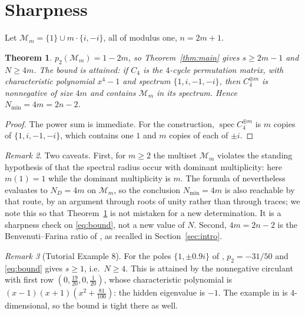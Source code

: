\documentclass[11pt]{article}
\theoremstyle{plain}
\newtheorem{theorem}{Theorem}
\theoremstyle{remark}
\newtheorem{remark}[theorem]{Remark}
\newcommand{\M}{\mathcal{M}}
\begin{document}
\section{Sharpness}\label{sec:sharp}

Let $\M_m=\{1\}\cup m\cdot\{i,-i\}$, all of modulus one, $n=2m+1$.

\begin{theorem}\label{thm:sharp}
$p_2(\M_m)=1-2m$, so Theorem~\ref{thm:main} gives $s\ge2m-1$ and $N\ge4m$. The bound is
attained: if $C_4$ is the $4$-cycle permutation matrix, with characteristic polynomial
$x^{4}-1$ and spectrum $\{1,i,-1,-i\}$, then $C_4^{\oplus m}$ is nonnegative of size $4m$
and contains $\M_m$ in its spectrum. Hence $N_{\min}=4m=2n-2$.
\end{theorem}

\begin{proof}
The power sum is immediate. For the construction, $\operatorname{spec}C_4^{\oplus m}$ is
$m$ copies of $\{1,i,-1,-i\}$, which contains one $1$ and $m$ copies of each of $\pm i$.
\end{proof}

\begin{remark}\label{rem:caveat}
Two caveats. First, for $m\ge2$ the multiset $\M_m$ violates the standing hypothesis of
\cite[Thms.~3.2, 4.1]{Ben20ELA} that the spectral radius occur with dominant multiplicity:
here $m(1)=1$ while the dominant multiplicity is $m$. The formula of
\cite[Thm.~4.1]{Ben20ELA} nevertheless evaluates to $N_D=4m$ on $\M_m$, so the conclusion
$N_{\min}=4m$ is also reachable by that route, by an argument through roots of unity rather
than through traces; we note this so that Theorem~\ref{thm:sharp} is not mistaken for a new
determination. It is a sharpness check on \eqref{eq:bound}, not a new value of $N$. Second,
$4m=2n-2$ is the Benvenuti--Farina ratio of \cite{BF99}, as recalled in
Section~\ref{sec:intro}.
\end{remark}

\begin{remark}[Tutorial Example 8]\label{rem:ex8}
For the poles $\{1,\pm0.9i\}$ of \cite[Ex.~8]{BF04}, $p_2=-31/50$ and \eqref{eq:bound}
gives $s\ge1$, i.e.\ $N\ge4$. This is attained by the nonnegative circulant with first row
$(0,\tfrac{19}{20},0,\tfrac1{20})$, whose characteristic polynomial is
$(x-1)(x+1)(x^{2}+\tfrac{81}{100})$: the hidden eigenvalue is $-1$. The example in
\cite{BF04} is $4$-dimensional, so the bound is tight there as well.
\end{remark}
\end{document}
